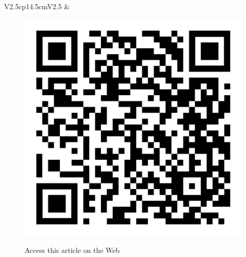 \begin{tabular}{V{2.5}cp{14.5cm}V{2.5}}
&\\
\end{tabular}

\vskip 1cm

\begin{figure}[H]
\centering
\includegraphics[scale=.15]{src/Figures/QR-codes/qr-code_non-orthogonal.png}

\medskip

{\large\sf Access this article on the Web}
\end{figure}
